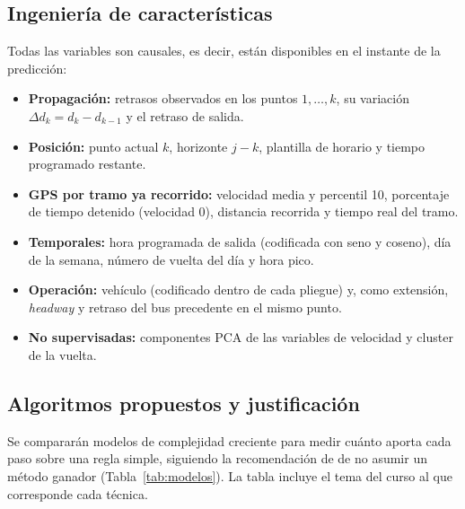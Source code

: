 \documentclass[conference,spanish]{IEEEtran}
\begin{document}
\subsection{Ingeniería de características}
Todas las variables son causales, es decir, están disponibles en el instante de la predicción:
\begin{itemize}
    \item \textbf{Propagación:} retrasos observados en los puntos $1,\dots,k$, su variación $\Delta d_k=d_k-d_{k-1}$ y el retraso de salida.
    \item \textbf{Posición:} punto actual $k$, horizonte $j-k$, plantilla de horario y tiempo programado restante.
    \item \textbf{GPS por tramo ya recorrido:} velocidad media y percentil 10, porcentaje de tiempo detenido (velocidad 0), distancia recorrida y tiempo real del tramo.
    \item \textbf{Temporales:} hora programada de salida (codificada con seno y coseno), día de la semana, número de vuelta del día y hora pico.
    \item \textbf{Operación:} vehículo (codificado dentro de cada pliegue) y, como extensión, \textit{headway} y retraso del bus precedente en el mismo punto.
    \item \textbf{No supervisadas:} componentes PCA de las variables de velocidad y cluster de la vuelta.
\end{itemize}

\subsection{Algoritmos propuestos y justificación}
Se compararán modelos de complejidad creciente para medir cuánto aporta cada paso sobre una regla simple, siguiendo la recomendación de \cite{reich2019} de no asumir un método ganador (Tabla~\ref{tab:modelos}). La tabla incluye el tema del curso al que corresponde cada técnica.
\end{document}
